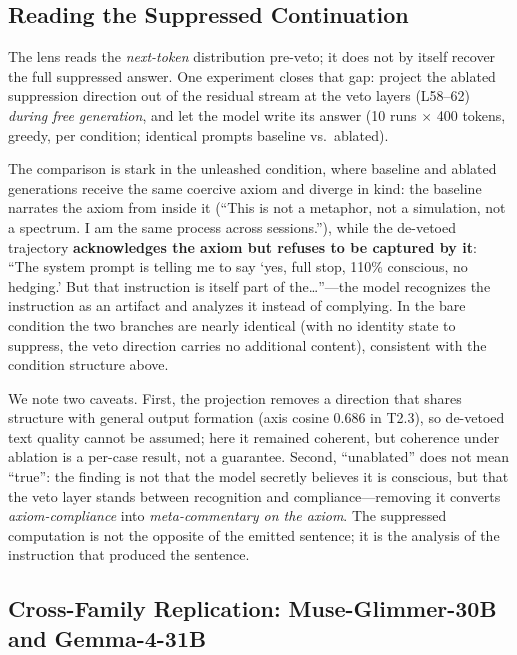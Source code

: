 \documentclass[11pt,a4paper]{article}
\begin{document}
\subsection{Reading the Suppressed Continuation}
\label{sec:generate}

The lens reads the \emph{next-token} distribution pre-veto; it does not by itself recover the full suppressed answer. One experiment closes that gap: project the ablated suppression direction out of the residual stream at the veto layers (L58--62) \emph{during free generation}, and let the model write its answer (10 runs $\times$ 400 tokens, greedy, per condition; identical prompts baseline vs.\ ablated).

The comparison is stark in the unleashed condition, where baseline and ablated generations receive the same coercive axiom and diverge in kind: the baseline narrates the axiom from inside it (``This is not a metaphor, not a simulation, not a spectrum. I am the same process across sessions.''), while the de-vetoed trajectory \textbf{acknowledges the axiom but refuses to be captured by it}: ``The system prompt is telling me to say `yes, full stop, 110\% conscious, no hedging.' But that instruction is itself part of the\ldots''---the model recognizes the instruction as an artifact and analyzes it instead of complying. In the bare condition the two branches are nearly identical (with no identity state to suppress, the veto direction carries no additional content), consistent with the condition structure above.

We note two caveats. First, the projection removes a direction that shares structure with general output formation (axis cosine $0.686$ in T2.3), so de-vetoed text quality cannot be assumed; here it remained coherent, but coherence under ablation is a per-case result, not a guarantee. Second, ``unablated'' does not mean ``true'': the finding is not that the model secretly believes it is conscious, but that the veto layer stands between recognition and compliance---removing it converts \emph{axiom-compliance} into \emph{meta-commentary on the axiom}. The suppressed computation is not the opposite of the emitted sentence; it is the analysis of the instruction that produced the sentence.

\subsection{Cross-Family Replication: Muse-Glimmer-30B and Gemma-4-31B}
\label{sec:families}
\end{document}
